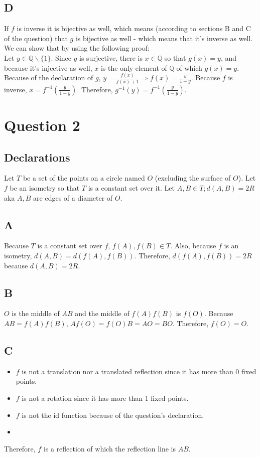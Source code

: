 \documentclass[12pt, oneside]{article}
\begin{document}
\subsection{D}
If $f$ is inverse it is bijective as well, which means (according to sections B and C of the question) that $g$ is bijective as well - which means that it's inverse as well.\\
We can show that by using the following proof:\\
Let $y \in \mathbb{Q}\backslash\{1\}$. Since $g$ is surjective, there is $x \in \mathbb{Q}$ so that $g(x) = y$, and because it's injective as well, $x$ is the only element of $\mathbb{Q}$ of which $g(x) = y$. Because of the declaration of $g$, $y = \frac{f(x)}{f(x) + 1} \Rightarrow f(x) = \frac{y}{1 - y}$. Because $f$ is inverse, $x = f^{-1}(\frac{y}{1 - y})$. Therefore, $g^{-1}(y) = f^{-1}(\frac{y}{1 - y})$.
\clearpage

\section{Question 2}
\setcounter{subsection}{-1}
\subsection{Declarations}
Let $T$ be a set of the points on a circle named $O$ (excluding the surface of $O$). Let $f$ be an isometry so that $T$ is a constant set over it. Let $A, B \in T; d(A, B) = 2R$ aka $A, B$ are edges of a diameter of $O$.

\subsection{A}
Because $T$ is a constant set over $f$, $f(A), f(B) \in T$. Also, because $f$ is an isometry, $d(A, B) = d(f(A), f(B))$. Therefore, $d(f(A), f(B)) = 2R$ because $d(A, B) = 2R$.

\subsection{B}
$O$ is the middle of $AB$ and the middle of $f(A)f(B)$ is $f(O)$. Because $AB = f(A)f(B)$, $Af(O) = f(O)B = AO = BO$. Therefore, $f(O) = O$.

\subsection{C}
\begin{itemize}
\item $f$ is not a translation nor a translated reflection since it has more than 0 fixed points.
\item $f$ is not a rotation since it has more than 1 fixed points.
\item $f$ is not the id function because of the question's declaration.
\item {}
\end{itemize}
Therefore, $f$ is a reflection of which the reflection line is $AB$.
\end{document}
